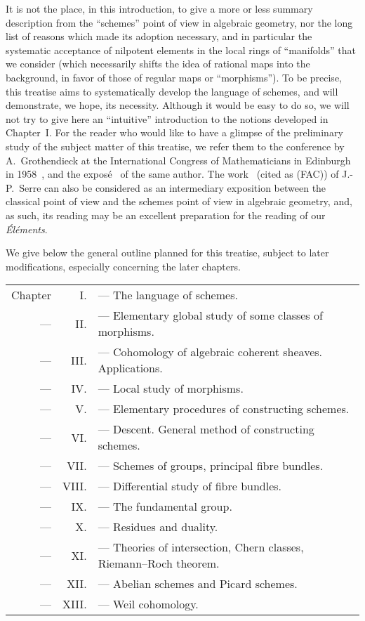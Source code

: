 \sectionbreak

It is not the place, in this introduction, to give a more or less summary description from the ``schemes'' point of view in algebraic geometry, nor the long list of reasons which made its adoption necessary, and in particular the systematic acceptance of nilpotent elements in the local rings of ``manifolds'' that we consider (which necessarily shifts the idea of rational maps into the background, in favor of those of regular maps or ``morphisms'').
To be precise, this treatise aims to systematically develop the language of schemes, and will demonstrate, we hope, its necessity.
Although it would be easy to do so,
we will not try to give here an ``intuitive'' introduction to the notions developed in Chapter~I.
For the reader who would like to have a glimpse of the preliminary study of the subject matter of this treatise, we refer them to the conference by A.~Grothendieck at the International Congress of Mathematicians in Edinburgh in 1958~\cite{I-7}, and the expos\'e~\cite{I-8} of the same author.
The work~\cite{I-14} (cited as (FAC)) of J.-P.~Serre can also be considered as an intermediary exposition between the classical point of view and the schemes point of view in algebraic geometry, and, as such, its reading may be an excellent preparation for the reading of our \emph{\'El\'ements}.

\sectionbreak

We give below the general outline planned for this treatise, subject to later modifications, especially concerning the later chapters.

\begin{tabular}{rrl}
Chapter & I. & --- The language of schemes.\\
--- & II. & --- Elementary global study of some classes of morphisms.\\
--- & III. & --- Cohomology of algebraic coherent sheaves. Applications.\\
--- & IV. & --- Local study of morphisms.\\
--- & V. & --- Elementary procedures of constructing schemes.\\
--- & VI. & --- Descent. General method of constructing schemes.\\
--- & VII. & --- Schemes of groups, principal fibre bundles.\\
--- & VIII. & --- Differential study of fibre bundles.\\
--- & IX. & --- The fundamental group.\\
--- & X. & --- Residues and duality.\\
--- & XI. & --- Theories of intersection, Chern classes,
Riemann--Roch theorem.\\
--- & XII. & --- Abelian schemes and Picard schemes.\\
--- & XIII. & --- Weil cohomology.
\end{tabular}\\

